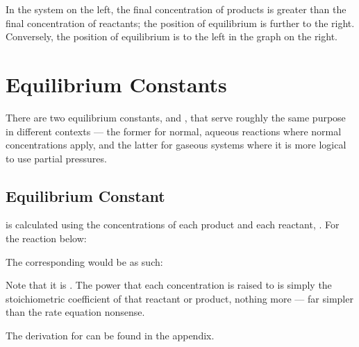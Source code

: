 			In the system on the left, the final concentration of products is greater than the final concentration of reactants;
			 the position of equilibrium is further to the right. Conversely, the position of equilibrium is to the left
			in the graph on the right.





	\pagebreak
	\section{Equilibrium Constants}

		There are two equilibrium constants, \Kc{} and \Kp{}, that serve roughly the same purpose in different contexts --- the former for normal,
		aqueous reactions where normal concentrations apply, and the latter for gaseous systems where it is more logical to use partial pressures.

		\subsection{Equilibrium Constant \texorpdfstring{\Kc{}}{Kc}}

			\Kc{} is calculated using the concentrations of each product and each reactant, . For the reaction below:


			The corresponding \Kc{} would be as such:

			\mathdiagram{
				\[ K_{c} = \frac{[\ch{C}]^{c}[\ch{D}]^{d}}{[\ch{A}]^{a}[\ch{B}]^{b}} \]
			}

			Note that it is . The power that each concentration is raised to is simply the stoichiometric
			coefficient of that reactant or product, nothing more --- far simpler than the rate equation nonsense.

			The derivation for \Kc{} can be found in the appendix.



